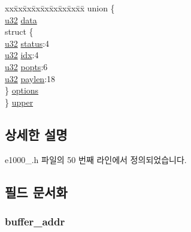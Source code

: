 \begin{DoxyCompactItemize}
\begin{tabbing}
\end{tabbing}\item 
\begin{tabbing}
xx\=xx\=xx\=xx\=xx\=xx\=xx\=xx\=xx\=\kill
union \{\\
\>\hyperlink{lib_2igb_2e1000__osdep_8h_a64e91c10a0d8fb627e92932050284264}{u32} \hyperlink{structe1000__adv__data__desc_a0e5b72ac4f845f11204b39c8fb0f5d91}{data}\\
\>struct \{\\
\>\>\hyperlink{lib_2igb_2e1000__osdep_8h_a64e91c10a0d8fb627e92932050284264}{u32} \hyperlink{structe1000__adv__data__desc_a088e3e37581e2ecb5079c1d75067923f}{status}:4\\
\>\>\hyperlink{lib_2igb_2e1000__osdep_8h_a64e91c10a0d8fb627e92932050284264}{u32} \hyperlink{structe1000__adv__data__desc_a804cf27668aec474e6cf9bf6ff60ced1}{idx}:4\\
\>\>\hyperlink{lib_2igb_2e1000__osdep_8h_a64e91c10a0d8fb627e92932050284264}{u32} \hyperlink{structe1000__adv__data__desc_a106d78282b65a8b40042211077712109}{popts}:6\\
\>\>\hyperlink{lib_2igb_2e1000__osdep_8h_a64e91c10a0d8fb627e92932050284264}{u32} \hyperlink{structe1000__adv__data__desc_a3745104ec47a98e80e861672b619526d}{paylen}:18\\
\>\} \hyperlink{structe1000__adv__data__desc_a1b5ed796e1a1728ad184779ebe4e323b}{options}\\
\} \hyperlink{structe1000__adv__data__desc_ad7daa4f748cda2aa3dcecb55e27ed121}{upper}\\

\end{tabbing}\end{DoxyCompactItemize}


\subsection{상세한 설명}


e1000\+\_.\+h 파일의 50 번째 라인에서 정의되었습니다.



\subsection{필드 문서화}
\subsubsection[{\texorpdfstring{buffer\+\_\+addr}{buffer_addr}}]{ buffer\+\_\+addr}\hypertarget{structe1000__adv__data__desc_a87d79130b57fb21eedf04b9d3945c3d6}{}\label{structe1000__adv__data__desc_a87d79130b57fb21eedf04b9d3945c3d6}


